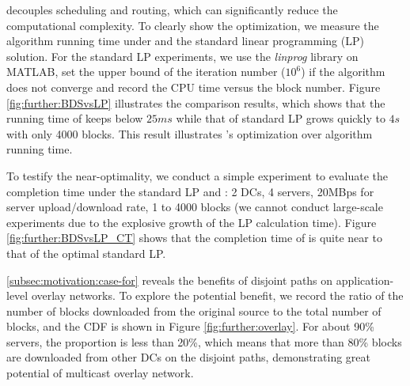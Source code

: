 \label{subsubsec:evaluation:depth}

 \name decouples scheduling and routing, which can significantly reduce the computational complexity. To clearly show the optimization, we measure the algorithm running time under \name and the standard linear programming (LP) solution. For the standard LP experiments, we use the \textit{linprog} library on MATLAB, set the upper bound of the iteration number ($10^6$) if the algorithm does not converge and record the CPU time versus the block number. Figure \ref{fig:further:BDSvsLP} illustrates the comparison results, which shows that the running time of \name keeps below $25ms$ while that of standard LP grows quickly to $4s$ with only 4000 blocks. This result illustrates \name's optimization over algorithm running time.

 To testify the near-optimality, we conduct a simple experiment to evaluate the completion time under the standard LP and \name: 2 DCs, 4 servers, 20MBps for server upload/download rate, 1 to 4000 blocks (we cannot conduct large-scale experiments due to the explosive growth of the LP calculation time). Figure \ref{fig:further:BDSvsLP_CT} shows that the completion time of \name is quite near to that of the optimal standard LP.


 \Section\ref{subsec:motivation:case-for} reveals the benefits of disjoint paths on application-level overlay networks. To explore the potential benefit, we record the ratio of the number of blocks downloaded from the original source to the total number of blocks, and the CDF is shown in Figure \ref{fig:further:overlay}. For about 90\% servers, the proportion is less than 20\%, which means that more than 80\% blocks are downloaded from other DCs on the disjoint paths, demonstrating great potential of multicast overlay network.



